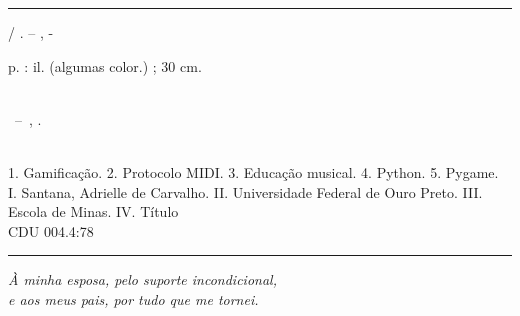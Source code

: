 \documentclass[
  12pt,
  openright,
  twoside,
  a4paper,
  english,
  brazil
]{abntex2}
\begin{document}
\begin{fichacatalografica}
  \vspace*{\fill}
  \hrule
  \begin{center}
  \begin{minipage}[c]{12.5cm}
    \imprimirautor

    \hspace{0.5cm}\imprimirtitulo / \imprimirautor. --
    \imprimirlocal, \imprimirdata-

    \hspace{0.5cm} p. : il. (algumas color.) ; 30 cm.\\

    \hspace{0.5cm}\imprimirorientadorRotulo~\imprimirorientador\\

    \hspace{0.5cm}
    \parbox[t]{\textwidth}{%
      \imprimirtipotrabalho~--~\imprimirinstituicao, \imprimirdata.}\\

    \hspace{0.5cm}
      1. Gamificação.
      2. Protocolo MIDI.
      3. Educação musical.
      4. Python.
      5. Pygame.
      I. Santana, Adrielle de Carvalho.
      II. Universidade Federal de Ouro Preto.
      III. Escola de Minas.
      IV. Título\\

    \hspace{8.75cm} CDU 004.4:78\\
  \end{minipage}
  \end{center}
  \hrule
\end{fichacatalografica}



\begin{dedicatoria}
  \vspace*{\fill}
  \flushright
  \noindent
  \textit{%
    À minha esposa, pelo suporte incondicional,\\
    e aos meus pais, por tudo que me tornei.}
  \vspace*{\fill}
\end{dedicatoria}
\end{document}
